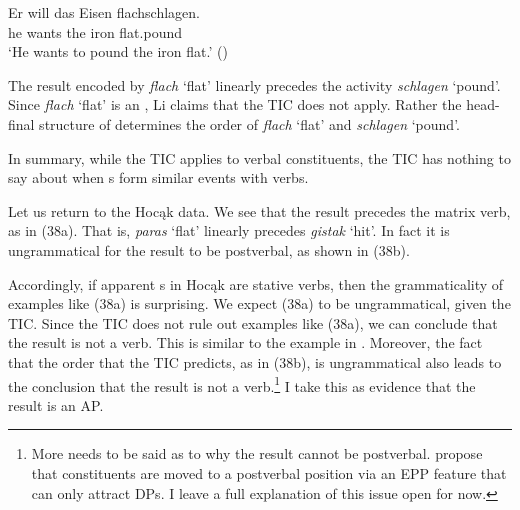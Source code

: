 \documentclass[output=paper]{LSP/langsci}
\begin{document}
\let\eachwordtwo=\upshape 

\begin{exe}
\ex\label{ex:rosen:37}
 \gll Er will das Eisen flachschlagen.\\
he wants the iron flat.pound\\
\glt `He wants to pound the iron flat.' (\citealt[501 (41)]{Li1993})

\end{exe}

The result encoded by \textit{flach} `flat' linearly precedes the activity \textit{schlagen} `pound'. Since \textit{flach} `flat' is an , Li claims that the TIC does not apply. Rather the head-final structure of  determines the order of \textit{flach} `flat' and \textit{schlagen} `pound'. 

In summary, while the TIC applies to verbal constituents, the TIC has nothing to say about when s form similar events with verbs.

Let us return to the Hocąk data. We see that the result precedes the matrix verb, as in (38a). That is, \textit{paras} `flat' linearly precedes \textit{gistak} `hit'. In fact it is ungrammatical for the result to be postverbal, as shown in (38b).


\let\eachwordtwo=\itshape
\begin{exe}
\ex\label{ex:rosen:38}
\begin{xlist}



\end{xlist}
\end{exe}

 
Accordingly, if apparent s in Hocąk are stative verbs, then the grammaticality of examples like (38a) is surprising. We expect (38a) to be ungrammatical, given the TIC. Since the TIC does not rule out examples like (38a), we can conclude that the result is not a verb. This is similar to the  example in . Moreover, the fact that the order that the TIC predicts, as in (38b), is ungrammatical also leads to the conclusion that the result is not a verb.\footnote{More needs to be said as to why the result cannot be postverbal. \citet{JohnsonRosen2014} propose that constituents are moved to a postverbal position via an EPP feature that can only attract DPs. I leave a full explanation of this issue open for now.} I take this as evidence that the result is an AP.
 
\end{document}
